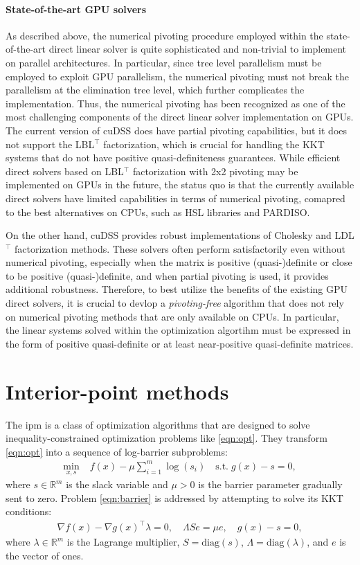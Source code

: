 \documentclass{article}
\begin{document}
\paragraph{State-of-the-art GPU solvers}
As described above, the numerical pivoting procedure employed within the state-of-the-art direct linear solver is quite sophisticated and non-trivial to implement on parallel architectures. In particular, since tree level parallelism must be employed to exploit GPU parallelism, the numerical pivoting must not break the parallelism at the elimination tree level, which further complicates the implementation. Thus, the numerical pivoting has been recognized as one of the most challenging components of the direct linear solver implementation on GPUs. The current version of cuDSS does have partial pivoting capabilities, but it does not support the LBL$^\top$ factorization, which is crucial for handling the KKT systems that do not have positive quasi-definiteness guarantees. While efficient direct solvers based on LBL$^\top$ factorization with 2x2 pivoting may be implemented on GPUs in the future, the status quo is that the currently available direct solvers have limited capabilities in terms of numerical pivoting, comapred to the best alternatives on CPUs, such as HSL libraries and PARDISO.

On the other hand, cuDSS provides robust implementations of Cholesky and LDL$^\top$ factorization methods. These solvers often perform satisfactorily even without numerical pivoting, especially when the matrix is positive (quasi-)definite or close to be positive (quasi-)definite, and when partial pivoting is used, it provides additional robustness.
Therefore, to best utilize the benefits of the existing GPU direct solvers, it is crucial to devlop a \emph{pivoting-free} algorithm that does not rely on numerical pivoting methods that are only available on CPUs.
In particular, the linear systems solved within the optimization algortihm must be expressed in the form of positive quasi-definite or at least near-positive quasi-definite matrices.


\section{Interior-point methods}\label{eqn:ipm}
The \gls*{ipm} is a class of optimization algorithms that are designed to solve inequality-constrained optimization problems like \cref{eqn:opt}. They transform \cref{eqn:opt} into a sequence of log-barrier subproblems:
\begin{align}\label{eqn:barrier}
  \min_{x,s } \; & f(x) - \mu \sum_{i=1}^m \log(s_i) \quad \text{s.t.} \; g(x) - s = 0 ,
\end{align}
where $s \in \mathbb{R}^m$ is the slack variable and $\mu > 0$ is the barrier parameter gradually sent to zero. Problem \cref{eqn:barrier} is addressed by attempting to solve its KKT conditions:
\begin{align}\label{eqn:kkt}
  \nabla f(x) - \nabla g(x)^\top \lambda = 0, \quad
  \Lambda S e = \mu e,\quad
  g(x) - s =   0 ,
\end{align}
where $\lambda \in \mathbb{R}^m$ is the Lagrange multiplier, $S = \text{diag}(s)$,
 $\Lambda = \text{diag}(\lambda)$, and $e$ is the vector of ones.
\end{document}
